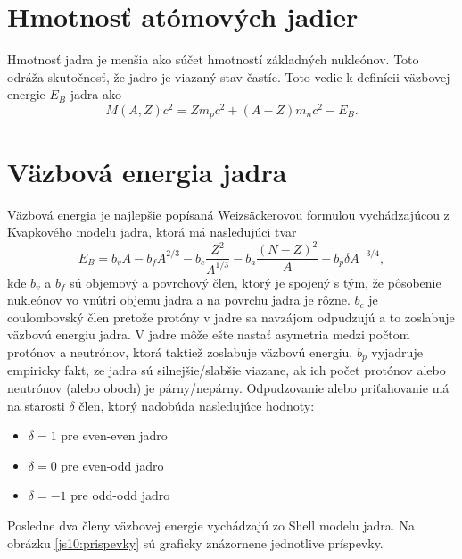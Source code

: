 \documentclass[../../main.tex]{subfiles}
\begin{document}
\section{Hmotnosť atómových jadier}
Hmotnosť jadra je menšia ako súčet hmotností základných nukleónov. Toto odráža skutočnosť, že jadro je viazaný stav častíc. Toto vedie k definícii väzbovej energie $E_B$ jadra ako $$  M(A,Z)c^2=Zm_pc^2+(A-Z)m_nc^2-E_B.$$
\section{Väzbová energia jadra}
Väzbová energia je najlepšie popísaná Weizsäckerovou formulou vychádzajúcou z Kvapkového modelu jadra, ktorá má nasledujúci tvar
$$ E_B=b_vA-b_fA^{2/3}-b_c\frac{Z^2}{A^{1/3}}-b_a\frac{(N-Z)^2}{A}+b_p\delta A^{-3/4},$$
kde $b_v$ a $b_f$ sú objemový a povrchový člen, ktorý je spojený s tým, že pôsobenie nukleónov vo vnútri objemu jadra a na povrchu jadra je rôzne. $b_c$ je coulombovský člen pretože protóny v jadre sa navzájom odpudzujú a to zoslabuje väzbovú energiu jadra. V jadre môže ešte nastať asymetria medzi počtom protónov a neutrónov, ktorá taktiež zoslabuje väzbovú energiu. $b_p$ vyjadruje empiricky fakt, ze jadra sú silnejšie/slabšie viazane, ak ich počet protónov alebo neutrónov (alebo oboch) je párny/nepárny. Odpudzovanie alebo priťahovanie má na starosti $\delta$ člen, ktorý nadobúda nasledujúce hodnoty:
\begin{itemize}
	\item $\delta=1$ pre even-even jadro
	\item $\delta=0$ pre even-odd jadro
	\item $\delta=-1$ pre odd-odd jadro
\end{itemize}
Posledne dva členy väzbovej energie vychádzajú zo Shell modelu jadra. Na obrázku \ref{js10:prispevky} sú graficky znázornene jednotlive príspevky.
 
\end{document}
